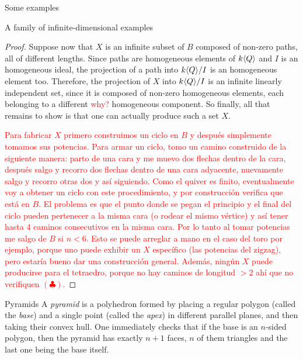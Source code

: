 \begin{chapter}{Some examples}
\begin{section}{A family of infinite-dimensional examples}
\begin{proof}
Suppose now that $X$ is an infinite subset of $B$ composed of non-zero paths, all of different lengths. Since paths are homogeneous elements of $k\langle Q\rangle$ and $I$ is an homogeneous ideal, the projection of a path into $k\langle Q\rangle/I$ is an homogeneous element too. Therefore, the projection of $X$ into $k\langle Q\rangle/I$ is an infinite linearly independent set, since it is composed of non-zero homogeneous elements, each belonging to a different \textcolor{red}{why?} homogeneous component. So finally, all that remains to show is that one can actually produce such a set $X$.

\textcolor{red}{Para fabricar $X$ primero construimos un ciclo en $B$ y después simplemente tomamos sus potencias. Para armar un ciclo, tomo un camino construido de la siguiente manera: parto de una cara y me muevo dos flechas dentro de la cara, después salgo y recorro dos flechas dentro de una cara adyacente, nuevamente salgo y recorro otras dos y así siguiendo. Como el quiver es finito, eventualmente voy a obtener un ciclo con este procedimiento, y por construcción verifica que está en $B$. El problema es que el punto donde se pegan el principio y el final del ciclo pueden pertenecer a la misma cara (o rodear el mismo vértice) y así tener hasta 4 caminos consecutivos en la misma cara. Por lo tanto al tomar potencias me salgo de $B$ si $n<6$. Esto se puede arreglar a mano en el caso del toro por ejemplo, porque uno puede exhibir un $X$ específico (las potencias del zigzag), pero estaría bueno dar una construcción general. Además, ningún $X$ puede producirse para el tetraedro, porque no hay caminos de longitud $>2$ ahí que no verifiquen $(\clubsuit)$.}
\end{proof}
\end{section}

\begin{section}{Pyramids}
A \emph{pyramid} is a polyhedron formed by placing a regular polygon (called the \emph{base}) and a single point (called the \emph{apex}) in different parallel planes, and then taking their convex hull. One immediately checks that if the base is an $n$-sided polygon, then the pyramid has exactly $n+1$ faces, $n$ of them triangles and the last one being the base itself.


\end{section}
\end{chapter}
